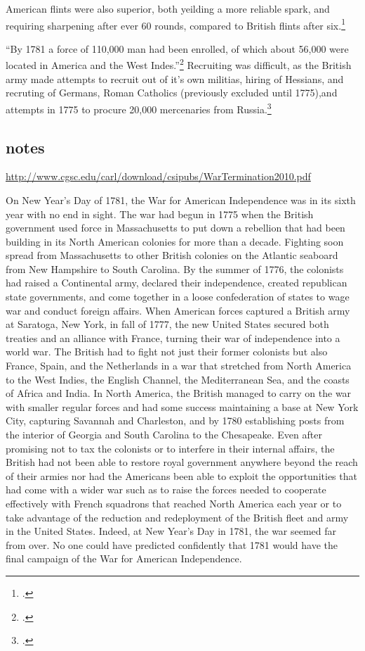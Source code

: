 American flints were also superior, both yeilding a more reliable spark, and
requiring sharpening after ever 60 rounds, compared to British flints after
six.\footcite[21]{curtis_org_1972}


``By 1781 a force of 110,000 man had been enrolled, of which about 56,000 were
located in America and the West Indes.''\footcite[51]{curtis_org_1972} Recruiting
was difficult, as the British army made attempts to recruit out of it's own
militias, hiring of Hessians, and recruting of Germans, Roman Catholics
(previously excluded until 1775),and attempts in 1775 to procure 20,000
mercenaries from Russia.\footcite[52]{curtis_org_1972} 


\subsection{notes}

\url{http://www.cgsc.edu/carl/download/csipubs/WarTermination2010.pdf}


On New Year's Day of 1781, the War for American Independence was in its sixth
year with no end in sight. The war had begun in 1775 when the British
government used force in Massachusetts to put down a rebellion that had been
building in its North American colonies for more than a decade. Fighting soon
spread from Massachusetts to other British colonies on the Atlantic seaboard
from New Hampshire to South Carolina. By the summer of 1776, the colonists had
raised a Continental army, declared their independence, created republican
state governments, and come together in a loose confederation of states to wage
war and conduct foreign affairs. When American forces captured a British army
at Saratoga, New York, in fall of 1777, the new United States secured both
treaties and an alliance with France, turning their war of independence into a
world war. The British had to fight not just their former colonists but also
France, Spain, and the Netherlands in a war that stretched from North America
to the West Indies, the English Channel, the Mediterranean Sea, and the coasts
of Africa and India. In North America, the British managed to carry on the war
with smaller regular forces and had some success maintaining a base at New York
City, capturing Savannah and Charleston, and by 1780 establishing posts from
the interior of Georgia and South Carolina to the Chesapeake. Even after
promising not to tax the colonists or to interfere in their internal affairs,
the British had not been able to restore royal government anywhere beyond the
reach of their armies nor had the Americans been able to exploit the
opportunities that had come with a wider war such as to raise the forces needed
to cooperate effectively with French squadrons that reached North America each
year or to take advantage of the reduction and redeployment of the British
fleet and army in the United States. Indeed, at New Year's Day in 1781, the war
seemed far from over. No one could have predicted confidently that 1781 would
have the final campaign of the War for American Independence.

